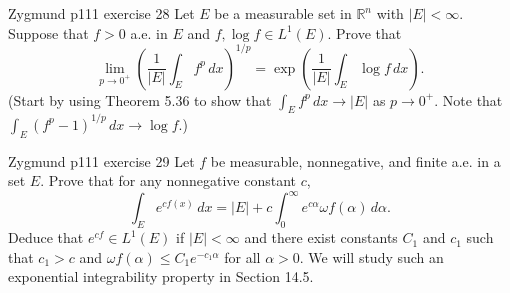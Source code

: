 \documentclass[UTF8,a4paper,10pt]{article}
\begin{document}
\begin{Problem}[]{Zygmund p111 exercise 28}
  Let $E$ be a measurable set in $\mathbb{R}^n$ with $|E| < \infty$. Suppose that $f > 0$ a.e. in $E$ and $f, \log f \in L^1(E)$. Prove that
\[
\lim_{{p \to 0^+}} \left( \frac{1}{|E|} \int_E f^p \,dx \right)^{1/p} = \exp\left(\frac{1}{|E|} \int_E \log f \,dx\right).
\]
(Start by using Theorem 5.36 to show that $\int_E f^p \,dx \to |E|$ as $p \to 0^+$. Note that $\int_E (f^p - 1)^{1/p} \,dx \to \log f$.)

\end{Problem}


\begin{Problem}[]{Zygmund p111 exercise 29}
  Let $f$ be measurable, nonnegative, and finite a.e. in a set $E$. Prove that for any nonnegative constant $c$,
\[
\int_E e^{cf(x)} \,dx = |E| + c \int_0^\infty e^{c\alpha} \omega f(\alpha) \,d\alpha.
\]
Deduce that $e^{cf} \in L^1(E)$ if $|E| < \infty$ and there exist constants $C_1$ and $c_1$ such that $c_1 > c$ and $\omega f(\alpha) \leq C_1e^{-c_1\alpha}$ for all $\alpha > 0$. We will study such an exponential integrability property in Section 14.5.

\end{Problem}
\end{document}
